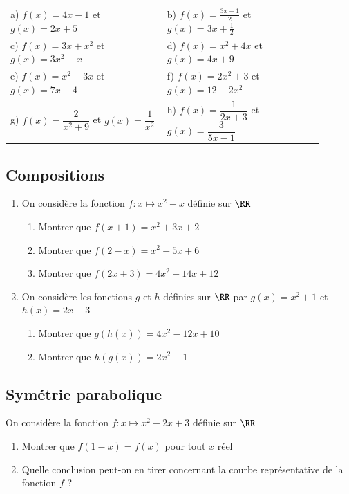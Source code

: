 \documentclass[oneside,12pt]{article}          			%
\begin{document}
\renewcommand{\arraystretch}{1.2}
\begin{tabular}{p{0.45\linewidth} p{0.45\linewidth}}
	a) $f(x)=4x-1$ \quad et \quad $g(x)=2x+5$ & b) $ f(x)=\frac{3x+1}{2}$ \quad et \quad $g(x)=3x+\frac{1}{2}$ \\
	c) $f(x)=3x+x^2$ \quad et \quad $g(x)=3x^2-x$ & d) $f(x)=x^2+4x$ \quad et \quad $g(x)=4x+9$ \\
	e) $f(x)=x^2+3x$ \quad et \quad $g(x)=7x-4$ & f) $f(x)= 2x^2+3$ \quad et \quad $g(x)=12-2x^2$ \\
	g) $f(x)=\dfrac{2}{x^2+9}$ \quad et \quad $g(x)=\dfrac{1}{x^2}$ & h) $f(x)= \dfrac{1}{2x+3}$ \quad et \quad $g(x)=\dfrac{3}{5x-1}$ \\
\end{tabular}



\subsection{Compositions}
\begin{enumerate}
	\item On considère la fonction $f:x\mapsto x^2+x$ définie sur $\RR$
	\begin{enumerate}
		\item Montrer que $f(x+1)=x^2+3x+2$
		\item Montrer que $f(2-x)=x^2-5x+6$
		\item Montrer que $f(2x+3)=4x^2+14x+12$
	\end{enumerate}
	\item On considère les fonctions $g$ et $h$ définies sur $\RR$ par $g(x)=x^2+1$ et $h(x)=2x-3$
	\begin{enumerate}
		\item Montrer que $g(h(x))=4x^2-12x+10$
		\item Montrer que $h(g(x))=2x^2-1$
	\end{enumerate}
\end{enumerate}



\subsection{Symétrie parabolique}
On considère la fonction $f:x\mapsto x^2-2x+3$ définie sur $\RR$
\begin{enumerate}
	\item Montrer que $f(1-x)=f(x)$ pour tout $x$ réel
	\item Quelle conclusion peut-on en tirer concernant la courbe représentative de la fonction $f$ ?
\end{enumerate}
\end{document}
